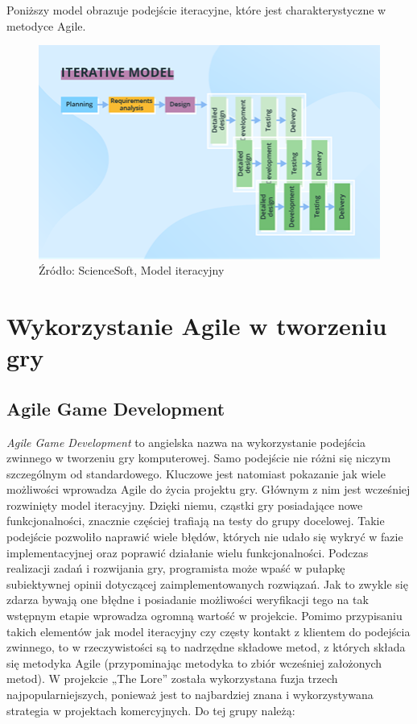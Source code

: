 \documentclass[oneside,polski,logo]{amuthesis}
\begin{document}
Poniższy model obrazuje podejście iteracyjne, które jest charakterystyczne w metodyce Agile. \\

\begin{figure}[h]
	\centering
	\includegraphics[width=15cm]{images/hyps/iterative-model.png}
	\caption{Źródło: ScienceSoft, Model iteracyjny \cite{wykresy}}
\end{figure}

\section{Wykorzystanie Agile w tworzeniu gry}
\subsection{Agile Game Development}
\emph{Agile Game Development} to angielska nazwa na wykorzystanie podejścia zwinnego w tworzeniu gry komputerowej. Samo podejście nie różni się niczym szczególnym od standardowego. Kluczowe jest natomiast pokazanie jak wiele możliwości wprowadza Agile do życia projektu gry. Głównym z nim jest wcześniej rozwinięty model iteracyjny. Dzięki niemu, cząstki gry posiadające nowe funkcjonalności, znacznie częściej trafiają na testy do grupy docelowej. Takie podejście pozwoliło naprawić wiele błędów, których nie udało się wykryć w fazie implementacyjnej oraz poprawić działanie wielu funkcjonalności. Podczas realizacji zadań i rozwijania gry, programista może wpaść w pułapkę subiektywnej opinii dotyczącej zaimplementowanych rozwiązań. Jak to zwykle się zdarza bywają one błędne i posiadanie możliwości weryfikacji tego na tak wstępnym etapie wprowadza ogromną wartość w projekcie. Pomimo przypisaniu takich elementów jak model iteracyjny czy częsty kontakt z klientem do podejścia zwinnego, to w rzeczywistości są to nadrzędne składowe metod, z których składa się metodyka Agile (przypominając metodyka to zbiór wcześniej założonych metod). W projekcie „The Lore” została wykorzystana fuzja trzech najpopularniejszych, ponieważ jest to najbardziej znana i wykorzystywana strategia w projektach komercyjnych.\cite{Agile game}\cite{agilePract} Do tej grupy należą:\\
\end{document}
